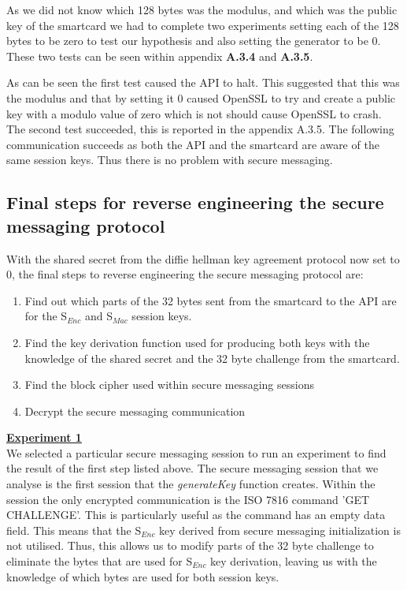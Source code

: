 \documentclass[bsc,frontabs,twoside,singlespacing,parskip,deptreport]{infthesis}     %
\begin{document}
As we did not know which 128 bytes was the modulus, and which was the public key of the smartcard we had to complete two experiments setting each of the 128 bytes to be zero to test our hypothesis and also setting the generator to be 0. These two tests can be seen within appendix \textbf{A.3.4} and \textbf{A.3.5}.

As can be seen the first test caused the API to halt. This suggested that this was the modulus and that by setting it 0 caused OpenSSL to try and create a public key with a modulo value of zero which is not should cause OpenSSL to crash. The second test succeeded, this is reported in the appendix A.3.5. The following communication succeeds as both the API and the smartcard are aware of the same session keys. Thus there is no problem with secure messaging.

\subsection{Final steps for reverse engineering the secure messaging protocol}
With the shared secret from the diffie hellman key agreement protocol now set to 0, the final steps to reverse engineering the secure messaging protocol are:
\begin{enumerate}
\item Find out which parts of the 32 bytes sent from the smartcard to the API are for the S$_{Enc}$ and S$_{Mac}$ session keys.
\item Find the key derivation function used for producing both keys with the knowledge of the shared secret and the 32 byte challenge from the smartcard.
\item Find the block cipher used within secure messaging sessions
\item Decrypt the secure messaging communication
\end{enumerate}

\underline{\textbf{Experiment 1}}\\
We selected a particular secure messaging session to run an experiment to find the result of the first step listed above. The secure messaging session that we analyse is the first session that the \textit{generateKey} function creates. Within the session the only encrypted communication is the ISO 7816 command 'GET CHALLENGE'. This is particularly useful as the command has an empty data field. This means that the S$_{Enc}$ key derived from secure messaging initialization is not utilised. Thus, this allows us to modify parts of the 32 byte challenge to eliminate the bytes that are used for S$_{Enc}$ key derivation, leaving us with the knowledge of which bytes are used for both session keys.
\end{document}
